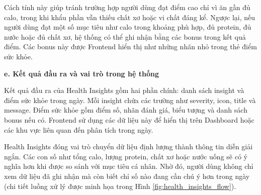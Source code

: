 \documentclass[12pt, a4paper]{report}
\begin{document}
Cách tính này giúp tránh trường hợp người dùng đạt điểm cao chỉ vì ăn gần đủ calo, trong khi khẩu phần vẫn thiếu chất xơ hoặc vi chất đáng kể. Ngược lại, nếu người dùng đạt một số mục tiêu như calo trong khoảng phù hợp, đủ protein, đủ nước hoặc đủ chất xơ, hệ thống có thể ghi nhận bằng các bonus trong kết quả điểm. Các bonus này được Frontend hiển thị như những nhãn nhỏ trong thẻ điểm sức khỏe.

\textbf{e. Kết quả đầu ra và vai trò trong hệ thống}

Kết quả đầu ra của Health Insights gồm hai phần chính: danh sách insight và điểm sức khỏe trong ngày. Mỗi insight chứa các trường như severity, icon, title và message. Điểm sức khỏe gồm điểm số, nhãn đánh giá, biểu tượng và danh sách bonus nếu có. Frontend sử dụng các dữ liệu này để hiển thị trên Dashboard hoặc các khu vực liên quan đến phân tích trong ngày.

Health Insights đóng vai trò chuyển dữ liệu định lượng thành thông tin diễn giải ngắn. Các con số như tổng calo, lượng protein, chất xơ hoặc nước uống sẽ có ý nghĩa hơn khi được so sánh với mục tiêu cá nhân. Nhờ đó, người dùng không chỉ xem dữ liệu đã ghi nhận mà còn biết chỉ số nào đang cần chú ý hơn trong ngày (chi tiết luồng xử lý được minh họa trong Hình \ref{fig:health_insights_flow}).
\end{document}
